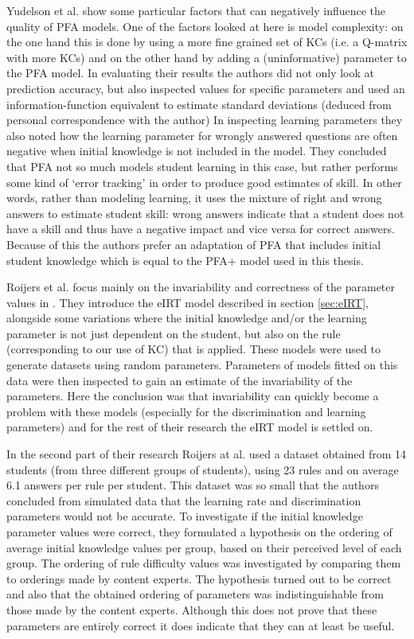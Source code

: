 \documentclass{scrartcl}
\begin{document}
Yudelson et al. show some particular factors that can negatively influence the quality of PFA models. One of the factors looked at here is model complexity: on the one hand this is done by using a more fine grained set of KCs (i.e. a Q-matrix with more KCs) and on the other hand by adding a (uninformative) parameter to the PFA model. In evaluating their results the authors did not only look at prediction accuracy, but also inspected values for specific parameters and used an information-function equivalent to estimate standard deviations (deduced from personal correspondence with the author) In inspecting learning parameters they also noted how the learning parameter for wrongly answered questions are often negative when initial knowledge is not included in the model. They concluded that PFA not so much models student learning in this case, but rather performs some kind of `error tracking' in order to produce good estimates of skill. In other words, rather than modeling learning, it uses the mixture of right and wrong answers to estimate student skill: wrong answers indicate that a student does not have a skill and thus have a negative impact and vice versa for correct answers. Because of this the authors prefer an adaptation of PFA that includes initial student knowledge which is equal to the PFA+ model used in this thesis.

Roijers et al. focus mainly on the invariability and correctness of the parameter values in \cite{eirt}. They introduce the eIRT model described in section \ref{sec:eIRT}, alongside some variations where the initial knowledge and/or the learning parameter is not just dependent on the student, but also on the rule (corresponding to our use of KC) that is applied. These models were used to generate datasets using random parameters. Parameters of models fitted on this data were then inspected to gain an estimate of the invariability of the parameters. Here the conclusion was that invariability can quickly become a problem with these models (especially for the discrimination and learning parameters) and for the rest of their research the eIRT model is settled on.

In the second part of their research Roijers at al. used a dataset obtained from 14 students (from three different groups of students), using 23 rules and on average 6.1 answers per rule per student. This dataset was so small that the authors concluded from simulated data that the learning rate and discrimination parameters would not be accurate. To investigate if the initial knowledge parameter values were correct, they formulated a hypothesis on the ordering of average initial knowledge values per group, based on their perceived level of each group. 
The ordering of rule difficulty values was investigated by comparing them to orderings made by content experts. The hypothesis turned out to be correct and also that the obtained ordering of parameters was indistinguishable from those made by the content experts. Although this does not prove that these parameters are entirely correct it does indicate that they can at least be useful.
\end{document}
